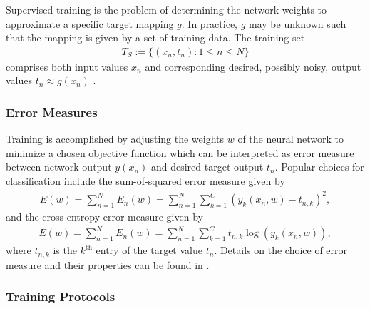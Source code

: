 Supervised training is the problem of determining the network weights to approximate a specific target mapping $g$. In practice, $g$ may be unknown such that the mapping is given by a set of training data. The training set
\begin{align}
	T_S := \{(x_n, t_n) : 1 \leq n \leq N\}
\end{align}
comprises both input values $x_n$ and corresponding desired, possibly noisy, output values $t_n \approx g(x_n)$ \cite{Haykin:2005}.


\subsubsection{Error Measures}

Training is accomplished by adjusting the weights $w$ of the neural network to minimize a chosen objective function which can be interpreted as error measure between network output $y(x_n)$ and desired target output $t_n$. Popular choices for classification include the sum-of-squared error measure given by
\begin{align}
	E(w) = \sum_{n = 1}^N E_n(w) = \sum_{n = 1}^N \sum_{k = 1}^C (y_k(x_n,w) - t_{n,k})^2,
\end{align}
and the cross-entropy error measure given by
\begin{align}
	E(w) = \sum_{n = 1}^N E_n(w) = \sum_{n = 1}^N \sum_{k = 1}^C t_{n,k} \log(y_k(x_n,w)),
\end{align}
where $t_{n,k}$ is the $k^{\text{th}}$ entry of the target value $t_n$. Details on the choice of error measure and their properties can be found in \cite{Bishop:1995}.

\subsubsection{Training Protocols}

